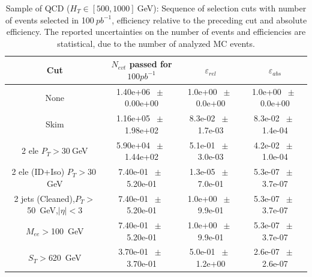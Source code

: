 \begin{table}[htbp] 
\begin{center} 
\begin{tabular}{|c|c|c|c|} 
\hline\hline 
 Cut & $N_{evt}$ passed for $100pb^{-1}$ & $\varepsilon_{rel}$ & $\varepsilon_{abs}$ \\ 
\hline\hline 
None       &        1.40e+06       $~\pm~$       0.00e+00        &        1.0e+00       $~\pm~$       0.0e+00        &        1.0e+00       $~\pm~$       0.0e+00       \\       
       Skim       &        1.16e+05       $~\pm~$       1.98e+02        &        8.3e-02       $~\pm~$       1.7e-03        &        8.3e-02       $~\pm~$       1.4e-04       \\       
       2 ele $P_T>30~$GeV       &        5.90e+04       $~\pm~$       1.44e+02        &        5.1e-01       $~\pm~$       3.0e-03        &        4.2e-02       $~\pm~$       1.0e-04       \\       
       2 ele (ID+Iso) $P_T>30~$GeV       &        7.40e-01       $~\pm~$       5.20e-01        &        1.3e-05       $~\pm~$       7.0e-01        &        5.3e-07       $~\pm~$       3.7e-07       \\       
       2 jets (Cleaned),$P_T>$50~GeV,$|\eta|<$3       &        7.40e-01       $~\pm~$       5.20e-01        &        1.0e+00       $~\pm~$       9.9e-01        &        5.3e-07       $~\pm~$       3.7e-07       \\       
       $M_{ee}>$100~GeV       &        7.40e-01       $~\pm~$       5.20e-01        &        1.0e+00       $~\pm~$       9.9e-01        &        5.3e-07       $~\pm~$       3.7e-07       \\       
       $S_T>$620~GeV       &        3.70e-01       $~\pm~$       3.70e-01        &        5.0e-01       $~\pm~$       1.2e+00        &        2.6e-07       $~\pm~$       2.6e-07       \\       
       \hline\hline 
\end{tabular} 
\end{center} 
\caption{Sample of QCD ($H_T \in [500,1000]~$GeV): Sequence of selection cuts with number of events selected in 100$~pb^{-1}$, efficiency relative to the preceding cut and absolute efficiency. The reported uncertainties on the number of events and efficiencies are statistical, due to the number of analyzed MC events.} 
\label{tab:effic-QCD-500-1000} 
\end{table} 

